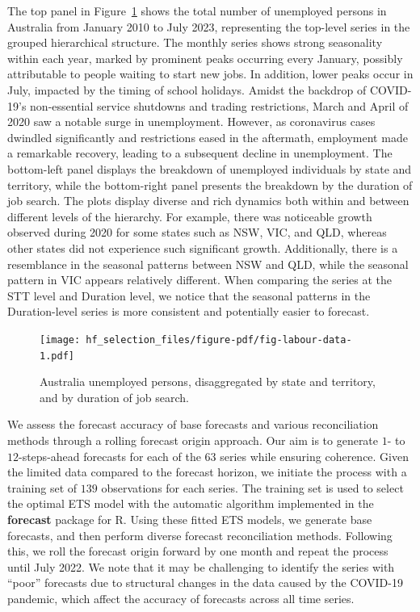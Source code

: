 \documentclass[11pt,a4paper,]{article}
\begin{document}
The top panel in Figure~\ref{fig-labour-data} shows the total number of
unemployed persons in Australia from January 2010 to July 2023,
representing the top-level series in the grouped hierarchical structure.
The monthly series shows strong seasonality within each year, marked by
prominent peaks occurring every January, possibly attributable to people
waiting to start new jobs. In addition, lower peaks occur in July,
impacted by the timing of school holidays. Amidst the backdrop of
COVID-19's non-essential service shutdowns and trading restrictions,
March and April of 2020 saw a notable surge in unemployment. However, as
coronavirus cases dwindled significantly and restrictions eased in the
aftermath, employment made a remarkable recovery, leading to a
subsequent decline in unemployment. The bottom-left panel displays the
breakdown of unemployed individuals by state and territory, while the
bottom-right panel presents the breakdown by the duration of job search.
The plots display diverse and rich dynamics both within and between
different levels of the hierarchy. For example, there was noticeable
growth observed during 2020 for some states such as NSW, VIC, and QLD,
whereas other states did not experience such significant growth.
Additionally, there is a resemblance in the seasonal patterns between
NSW and QLD, while the seasonal pattern in VIC appears relatively
different. When comparing the series at the STT level and Duration
level, we notice that the seasonal patterns in the Duration-level series
is more consistent and potentially easier to forecast.

\begin{figure}

{\centering \texttt{[image: hf\_selection\_files/figure-pdf/fig-labour-data-1.pdf]}

}

\caption{\label{fig-labour-data}Australia unemployed persons,
disaggregated by state and territory, and by duration of job search.}

\end{figure}

We assess the forecast accuracy of base forecasts and various
reconciliation methods through a rolling forecast origin approach. Our
aim is to generate \(1\)- to \(12\)-steps-ahead forecasts for each of
the \(63\) series while ensuring coherence. Given the limited data
compared to the forecast horizon, we initiate the process with a
training set of \(139\) observations for each series. The training set
is used to select the optimal ETS model with the automatic algorithm
implemented in the \textbf{forecast} package for R. Using these fitted
ETS models, we generate base forecasts, and then perform diverse
forecast reconciliation methods. Following this, we roll the forecast
origin forward by one month and repeat the process until July 2022. We
note that it may be challenging to identify the series with ``poor''
forecasts due to structural changes in the data caused by the COVID-19
pandemic, which affect the accuracy of forecasts across all time series.
\end{document}

